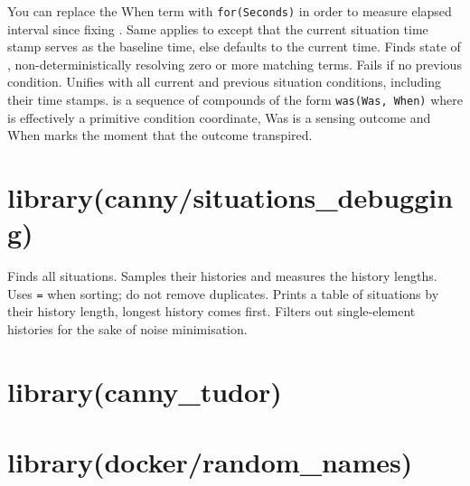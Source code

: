 \begin{description}
\begin{description}
You can replace the When term with \verb$for(Seconds)$ in order to
measure elapsed interval since fixing . Same applies to
 except that the current situation time stamp serves
as the baseline time, else defaults to the current time.
Finds  state of , non-deterministically
resolving zero or more matching  terms. Fails if no
previous  condition.
Unifies  with all current and previous situation
conditions, including their time stamps.  is a sequence
of compounds of the form \verb$was(Was, When)$ where  is
effectively a primitive condition coordinate, Was is a sensing
outcome and When marks the moment that the outcome transpired.
\end{description}
\end{description}

\chapter{library(canny/situations_debugging)}\label{sec:situationsdebugging}

\begin{description}
Finds all situations. Samples their histories and measures the
history lengths. Uses \verb$=$ when sorting; do not remove duplicates.
Prints a table of situations by their history length, longest
history comes first. Filters out single-element histories for the
sake of noise minimisation.
\end{description}

\chapter{library(canny_tudor)}\label{sec:cannytudor}\chapter{library(docker/random_names)}\label{sec:randomnames}

